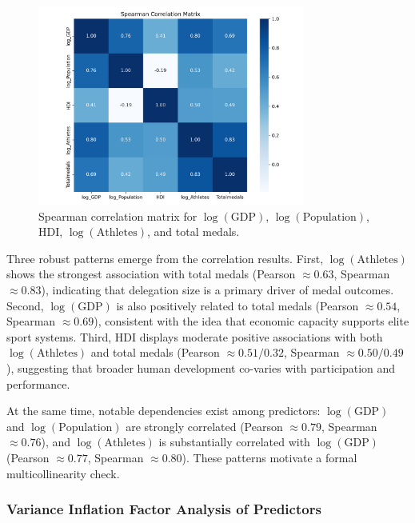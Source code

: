 \documentclass[11pt,twoside]{article}
\numberwithin{Theorem}{section}
\numberwithin{Definition}{section}
\numberwithin{Lemma}{section}
\numberwithin{Algorithm}{section}
\numberwithin{equation}{section}
\begin{document}
\begin{figure}[htbp]
  \centering
  \includegraphics[width=0.78\textwidth]{spearman_correlation_matrix.png}
  \caption{Spearman correlation matrix for $\log(\mathrm{GDP})$, $\log(\mathrm{Population})$, HDI, $\log(\mathrm{Athletes})$, and total medals.}
  \label{fig:corr_spearman_all}
\end{figure}


Three robust patterns emerge from the correlation results. 
First, $\log(\mathrm{Athletes})$ shows the strongest association with total medals (Pearson $\approx 0.63$, Spearman $\approx 0.83$), indicating that delegation size is a primary driver of medal outcomes. 
Second, $\log(\mathrm{GDP})$ is also positively related to total medals (Pearson $\approx 0.54$, Spearman $\approx 0.69$), consistent with the idea that economic capacity supports elite sport systems. 
Third, HDI displays moderate positive associations with both $\log(\mathrm{Athletes})$ and total medals (Pearson $\approx 0.51/0.32$, Spearman $\approx 0.50/0.49$), suggesting that broader human development co-varies with participation and performance.

At the same time, notable dependencies exist among predictors: $\log(\mathrm{GDP})$ and $\log(\mathrm{Population})$ are strongly correlated (Pearson $\approx 0.79$, Spearman $\approx 0.76$), and $\log(\mathrm{Athletes})$ is substantially correlated with $\log(\mathrm{GDP})$ (Pearson $\approx 0.77$, Spearman $\approx 0.80$). These patterns motivate a formal multicollinearity check.

\subsubsection{Variance Inflation Factor Analysis of Predictors}
\end{document}
